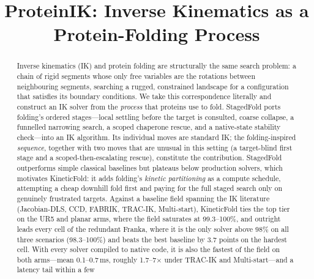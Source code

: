 \documentclass[10pt,conference]{IEEEtran}
\begin{document}
\title{ProteinIK: Inverse Kinematics as a\\Protein-Folding Process}

\author{
}

\maketitle

\begin{abstract}
Inverse kinematics (IK) and protein folding are structurally the same search
problem: a chain of rigid segments whose only free variables are the rotations
between neighbouring segments, searching a rugged, constrained landscape for a
configuration that satisfies its boundary conditions. We take this
correspondence literally and construct an IK solver from the \emph{process}
that proteins use to fold. StagedFold ports folding's ordered stages---local
settling before the target is consulted, coarse collapse, a funnelled narrowing
search, a scoped chaperone rescue, and a native-state stability check---into an
IK algorithm. Its individual moves are standard IK; the folding-inspired
\emph{sequence}, together with two moves that are unusual in this setting (a
target-blind first stage and a scoped-then-escalating rescue), constitute the
contribution. StagedFold outperforms simple classical baselines but plateaus
below production solvers, which motivates KineticFold: it adds folding's
\emph{kinetic partitioning} as a compute schedule, attempting a cheap downhill
fold first and paying for the full staged search only on genuinely frustrated
targets. Against a baseline field spanning the IK literature (Jacobian-DLS,
CCD, FABRIK, TRAC-IK, Multi-start), KineticFold ties the top tier on the UR5
and planar arms, where the field saturates at 99.3--100\%, and outright leads
every cell of the redundant Franka, where it is the only solver above 98\% on
all three scenarios (98.3--100\%) and beats the best baseline by 3.7 points on
the hardest cell. With every solver compiled to native code, it is also the
fastest of the field on both arms---mean 0.1--0.7\,ms, roughly
1.7--7$\times$ under TRAC-IK and Multi-start---and a latency tail within a few

\end{abstract}
\end{document}
